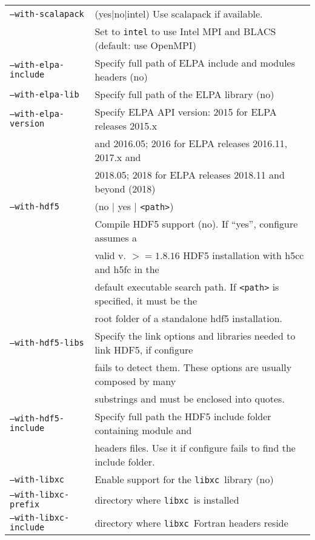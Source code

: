 \documentclass[12pt,a4paper]{article}
\def\libxc{\texttt{libxc}}
\begin{document}
\begin{tabular}{ll}
\texttt{--with-scalapack}&        (yes$|$no$|$intel) Use scalapack if available. \\
      &Set to \texttt{intel} to use Intel MPI and BLACS (default: use OpenMPI)\\
\texttt{--with-elpa-include}&   Specify full path of ELPA include and modules
  headers (no)\\
\texttt{--with-elpa-lib}& Specify full path of the ELPA library (no)\\
\texttt{--with-elpa-version}& Specify ELPA API version: 2015 for ELPA releases 2015.x\\
                            & and 2016.05; 2016 for ELPA releases 2016.11, 2017.x and\\
			    & 2018.05; 2018 for ELPA releases 2018.11 and beyond (2018)\\
\texttt{--with-hdf5}&  (no $|$  yes $|$ \texttt{<path>}) \\
	                    & Compile HDF5 support (no). If ``yes'', configure assumes a \\
                            & valid v. $>=1.8.16$ HDF5 installation with h5cc and h5fc in the \\
                            &  default executable search path. If \texttt{<path>} is specified, it must be the  \\
                            & root folder of a standalone hdf5 installation. \\
\texttt{--with-hdf5-libs}   & Specify the link options and libraries needed to link HDF5, if configure \\
                            &  fails to detect them. These options are usually composed by many \\
                            & substrings and must be enclosed into quotes. \\
\texttt{--with-hdf5-include}& Specify full path the HDF5 include folder containing module and \\
&  headers files. Use it if configure fails to find the include folder. \\
\texttt{--with-libxc}        & Enable support for the \libxc\ library (no) \\
\texttt{--with-libxc-prefix} & directory where \libxc\ is installed \\
\texttt{--with-libxc-include}& directory where \libxc\ Fortran headers reside\\
\end{tabular}\\
\end{document}
